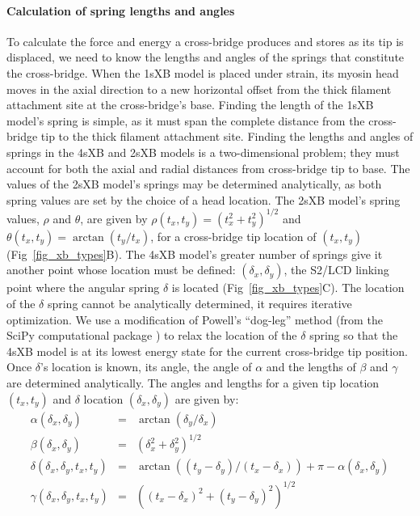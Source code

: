 \documentclass[10pt]{article}
\newcommand{\citep}[1]{\cite{#1}} %
\begin{document}
\paragraph{Calculation of spring lengths and angles} %
To calculate the force and energy a cross-bridge produces and stores as its tip is displaced, we need to know the lengths and angles of the springs that constitute the cross-bridge. 
When the 1sXB model is placed under strain, its myosin head moves in the axial direction to a new horizontal offset from the thick filament attachment site at the cross-bridge's base.
Finding the length of the 1sXB model's spring is simple, as it must span the complete distance from the cross-bridge tip to the thick filament attachment site. 
Finding the lengths and angles of springs in the 4sXB and 2sXB models is a two-dimensional problem; they must account for both the axial and radial distances from cross-bridge tip to base.
The values of the 2sXB model's springs may be determined analytically, as both spring values are set by the choice of a head location. 
The 2sXB model's spring values, $\rho$ and $\theta$, are given by $\rho(t_x, t_y)=(t_x^2 + t_y^2)^{1/2}$ and $\theta(t_x, t_y)=\arctan(t_y/t_x)$, for a cross-bridge tip location of $(t_x, t_y)$ (Fig~\ref{fig_xb_types}B). 
The 4sXB model's greater number of springs give it another point whose location must be defined: $(\delta_x, \delta_y)$, the S2/LCD linking point where the angular spring $\delta$ is located (Fig~\ref{fig_xb_types}C). 
The location of the $\delta$ spring cannot be analytically determined, it requires iterative optimization. 
We use a modification of Powell's ``dog-leg'' method (from the SciPy computational package \citep{SciPy}) to relax the location of the $\delta$ spring so that the 4sXB model is at its lowest energy state for the current cross-bridge tip position.
Once $\delta$'s location is known, its angle, the angle of $\alpha$ and the lengths of $\beta$ and $\gamma$ are determined analytically.
The angles and lengths for a given tip location $(t_x, t_y)$ and $\delta$ location $(\delta_x, \delta_y)$ are given by:
\begin{eqnarray*}
\label{4sXB_spring_values}
\alpha(\delta_x, \delta_y) &=& \arctan(\delta_y/\delta_x) \\
\beta(\delta_x, \delta_y) &=& (\delta_x^2 + \delta_y^2)^{1/2} \\
\delta(\delta_x, \delta_y, t_x, t_y) &=& \arctan((t_y-\delta_y)/(t_x-\delta_x)) + \pi - \alpha(\delta_x, \delta_y) \\
\gamma(\delta_x, \delta_y, t_x, t_y) &=& ((t_x-\delta_x)^2 + (t_y-\delta_y)^2)^{1/2} 
\end{eqnarray*}
\end{document}
